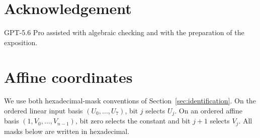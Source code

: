\documentclass[11pt]{article}
\begin{document}
\section*{Acknowledgement}

GPT-5.6 Pro assisted with algebraic checking and with the preparation of the
exposition.

\appendix

\section{Affine coordinates}

We use both hexadecimal-mask conventions of
Section~\ref{sec:identification}.  On the ordered linear input basis
\((U_0,\ldots,U_7)\), bit \(j\) selects \(U_j\).  On an ordered affine
basis \((1,V_0,\ldots,V_{n-1})\), bit zero selects the constant and bit
\(j+1\) selects \(V_j\).  All masks below are written in hexadecimal.
\end{document}
